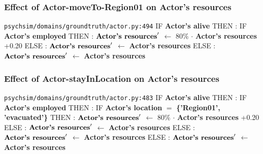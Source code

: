\documentclass{article}%
\begin{document}
\subsubsection{Effect of Actor{-}moveTo{-}Region01 on Actor's resources}%
\label{ssubsec:Effect of Actor{-}moveTo{-}Region01 on Actor's resources}%
\begin{flushleft}%
\verb|psychsim/domains/groundtruth/actor.py:494|%
\linebreak%
IF %
\textbf{Actor's alive}%
\linebreak%
\hspace*{2em}%
THEN %
: %
IF %
\textbf{Actor's employed}%
\linebreak%
\hspace*{4em}%
THEN %
: %
$\mbox{\textbf{Actor's resources}} '$%
$\leftarrow$%
80\%%
$\cdot$%
\textbf{Actor's resources}%
+0.20%
\linebreak%
\hspace*{4em}%
ELSE %
: %
$\mbox{\textbf{Actor's resources}} '$%
$\leftarrow$%
\textbf{Actor's resources}%
\linebreak%
\hspace*{2em}%
ELSE %
: %
$\mbox{\textbf{Actor's resources}} '$%
$\leftarrow$%
\textbf{Actor's resources}%
\end{flushleft}

%
\subsubsection{Effect of Actor{-}stayInLocation on Actor's resources}%
\label{ssubsec:Effect of Actor{-}stayInLocation on Actor's resources}%
\begin{flushleft}%
\verb|psychsim/domains/groundtruth/actor.py:483|%
\linebreak%
IF %
\textbf{Actor's alive}%
\linebreak%
\hspace*{2em}%
THEN %
: %
IF %
\textbf{Actor's employed}%
\linebreak%
\hspace*{4em}%
THEN %
: %
IF %
\textbf{Actor's location}%
$=$%
\textbf{\{'Region01', 'evacuated'\}}%
\linebreak%
\hspace*{6em}%
THEN %
: %
$\mbox{\textbf{Actor's resources}} '$%
$\leftarrow$%
80\%%
$\cdot$%
\textbf{Actor's resources}%
+0.20%
\linebreak%
\hspace*{6em}%
ELSE %
: %
$\mbox{\textbf{Actor's resources}} '$%
$\leftarrow$%
\textbf{Actor's resources}%
\linebreak%
\hspace*{4em}%
ELSE %
: %
$\mbox{\textbf{Actor's resources}} '$%
$\leftarrow$%
\textbf{Actor's resources}%
\linebreak%
\hspace*{2em}%
ELSE %
: %
$\mbox{\textbf{Actor's resources}} '$%
$\leftarrow$%
\textbf{Actor's resources}%
\end{flushleft}
\end{document}
